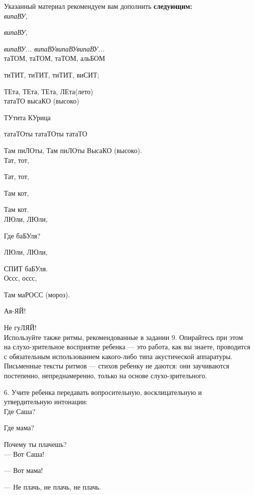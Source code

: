 \documentclass[a5paper]{book}
\renewcommand{\emph}[1]{\textit{#1}}
\begin{document}
Указанный материал рекомендуем вам дополнить \textbf{следующим:} \\

\emph{випаВУ,}

\emph{випаВУ,}

\emph{випаВУ... випаВУвипаВУвипаВУ...} \\

таТОМ, таТОМ, таТОМ, альБОМ

тиТИТ, тиТИТ, тиТИТ, виСИТ;

ТЕта, ТЕта, ТЕта, ЛЕта(лето) \\

татаТО высаКО (высоко)

ТУтита КУрица

татаТОты татаТОты татаТО

Там пиЛОты, Там пиЛОты ВысаКО (высоко). \\

Тат, тот,

Тат, тот,

Там кот,

Там кот. \\

ЛЮли, ЛЮли,

Где баБУля?

ЛЮли, ЛЮли,

СПИТ баБУля. \\

Оссс, оссс,

Там маРОСС (мороз).

Ая-ЯЙ!

Не гуЛЯЙ! \\


Используйте также ритмы, рекомендованные в задании 9. Опирайтесь при
этом на слухо-зрительное восприятие ребенка --- это работа, как вы
знаете, проводится с обязательным использованием какого-либо типа
акустической аппаратуры. Письменные тексты ритмов --- стихов ребенку не
даются: они заучиваются постепенно, непреднамеренно, только на основе
слухо-зрительного.

6. Учите ребенка передавать вопросительную, восклицательную и
утвердительную интонации: \\

Где Саша?

Где мама?

Почему ты плачешь? \\

--- Вот Саша!

--- Вот мама!

--- Не плачь, не плачь, не плачь. \\
\end{document}
